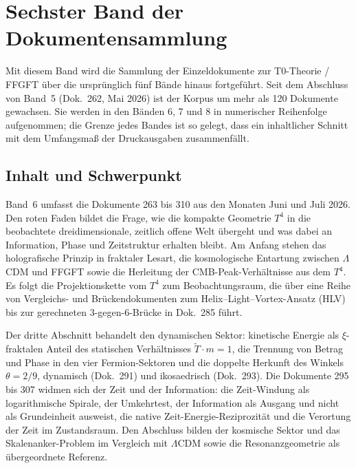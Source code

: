 
\section*{Sechster Band der Dokumentensammlung}

Mit diesem Band wird die Sammlung der Einzeldokumente zur T0-Theorie / FFGFT
über die ursprünglich fünf Bände hinaus fortgeführt. Seit dem Abschluss von
Band~5 (Dok.~262, Mai 2026) ist der Korpus um mehr als 120 Dokumente
gewachsen. Sie werden in den Bänden 6, 7 und 8 in numerischer Reihenfolge
aufgenommen; die Grenze jedes Bandes ist so gelegt, dass ein inhaltlicher
Schnitt mit dem Umfangsmaß der Druckausgaben zusammenfällt.

\subsection*{Inhalt und Schwerpunkt}

Band~6 umfasst die Dokumente 263 bis 310 aus den Monaten Juni und Juli 2026.
Den roten Faden bildet die Frage, wie die kompakte Geometrie $T^4$ in die
beobachtete dreidimensionale, zeitlich offene Welt übergeht und was dabei an
Information, Phase und Zeitstruktur erhalten bleibt. Am Anfang stehen das
holografische Prinzip in fraktaler Lesart, die kosmologische Entartung
zwischen $\Lambda$CDM und FFGFT sowie die Herleitung der CMB-Peak-Verhältnisse
aus dem $T^4$. Es folgt die Projektionskette vom $T^4$ zum Beobachtungsraum,
die über eine Reihe von Vergleichs- und Brückendokumenten zum
Helix--Light--Vortex-Ansatz (HLV) bis zur gerechneten 3-gegen-6-Brücke in
Dok.~285 führt.

Der dritte Abschnitt behandelt den dynamischen Sektor: kinetische Energie als
$\xi$-fraktalen Anteil des statischen Verhältnisses $\tilde T\cdot m=1$, die
Trennung von Betrag und Phase in den vier Fermion-Sektoren und die doppelte
Herkunft des Winkels $\theta=2/9$, dynamisch (Dok.~291) und ikosaedrisch
(Dok.~293). Die Dokumente 295 bis 307 widmen sich der Zeit und der
Information: die Zeit-Windung als logarithmische Spirale, der Umkehrtest, der
Information als Ausgang und nicht als Grundeinheit ausweist, die native
Zeit-Energie-Reziprozität und die Verortung der Zeit im Zustandsraum. Den
Abschluss bilden der kosmische Sektor und das Skalenanker-Problem im Vergleich
mit $\Lambda$CDM sowie die Resonanzgeometrie als übergeordnete Referenz.

